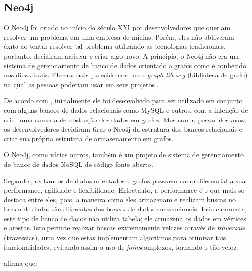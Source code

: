 \subsection{Neo4j}

\par O Neo4j foi criado no início do século XXI por desenvolvedores que queriam resolver um problema em uma empresa de mídias. Porém, eles não obtiveram êxito ao tentar resolver tal problema utilizando as tecnologias tradicionais, portanto, decidiram arriscar e criar algo novo. A princípio, o Neo4j não era um sistema de gerenciamento de banco de dados orientado a grafos como é conhecido nos dias atuais. Ele era mais parecido com uma \textit{graph library} (biblioteca de grafo) na qual as pessoas poderiam usar em seus projetos \cite{bruggen_learning_neo4j}.

\par De acordo com , inicialmente ele foi desenvolvido para ser utilizado em conjunto com alguns bancos de dados relacionais como MySQL e outros, com a intenção de criar uma camada de abstração dos dados em grafos. Mas com o passar dos anos, os desenvolvedores decidiram tirar o Neo4j da estrutura dos bancos relacionais e criar sua própria estrutura de armazenamento em grafos.

\par O Neo4j, como vários outros, também é um projeto de sistema de gerenciamento de banco de dados NoSQL de código fonte aberto.

\par Segundo , os bancos de dados orientados a grafos possuem como diferencial a sua performance, agilidade e flexibilidade. Entretanto, a performance é o que mais se destaca entre eles, pois, a maneira como eles armazenam e realizam buscas no banco de dados são diferentes dos bancos de dados convencionais. Primeiramente, este tipo de banco de dados não utiliza tabela; ele armazena os dados em vértices e arestas. Isto permite realizar buscas extremamente velozes através de \textit{traversals} (travessias), uma vez que estas implementam algoritmos para otimizar tais funcionalidades, evitando assim o uso de \textit{joins}\footnotemark[10] complexos, tornando-o tão veloz.


\par {} afirma que:

